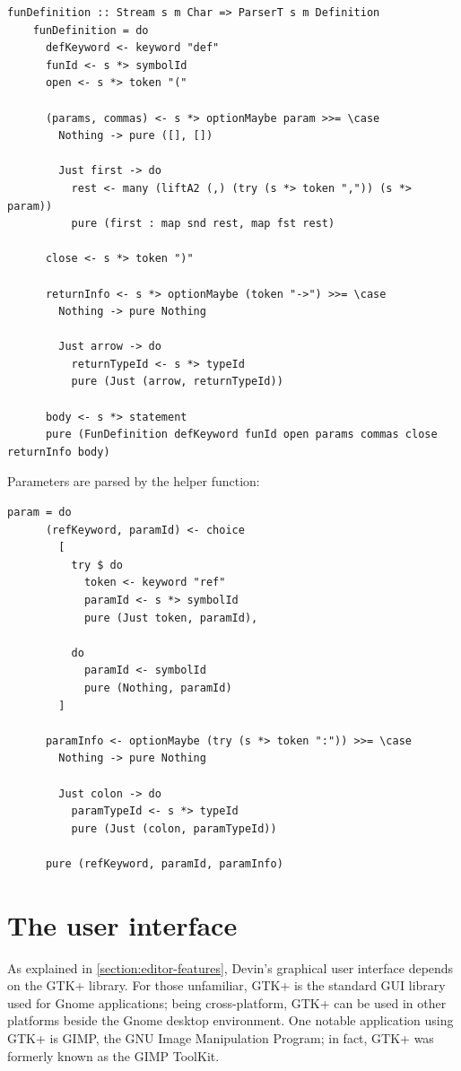 \documentclass[UdineBachThesis,american,11pt]{PhdThesis}
\begin{document}
  \begin{lstlisting}[gobble=4,basicstyle=\ttfamily\small]
    funDefinition :: Stream s m Char => ParserT s m Definition
    funDefinition = do
      defKeyword <- keyword "def"
      funId <- s *> symbolId
      open <- s *> token "("

      (params, commas) <- s *> optionMaybe param >>= \case
        Nothing -> pure ([], [])

        Just first -> do
          rest <- many (liftA2 (,) (try (s *> token ",")) (s *> param))
          pure (first : map snd rest, map fst rest)

      close <- s *> token ")"

      returnInfo <- s *> optionMaybe (token "->") >>= \case
        Nothing -> pure Nothing

        Just arrow -> do
          returnTypeId <- s *> typeId
          pure (Just (arrow, returnTypeId))

      body <- s *> statement
      pure (FunDefinition defKeyword funId open params commas close returnInfo body)
  \end{lstlisting}

  \newpage

  Parameters are parsed by the \lstinline@param@ helper function:

  \begin{lstlisting}[gobble=4,basicstyle=\ttfamily\small]
    param = do
      (refKeyword, paramId) <- choice
        [
          try $ do
            token <- keyword "ref"
            paramId <- s *> symbolId
            pure (Just token, paramId),

          do
            paramId <- symbolId
            pure (Nothing, paramId)
        ]

      paramInfo <- optionMaybe (try (s *> token ":")) >>= \case
        Nothing -> pure Nothing

        Just colon -> do
          paramTypeId <- s *> typeId
          pure (Just (colon, paramTypeId))

      pure (refKeyword, paramId, paramInfo)
  \end{lstlisting}

  \section{The user interface}

  As explained in \autoref{section:editor-features}, Devin's graphical user
  interface depends on the GTK+ library. For those unfamiliar, GTK+ is the
  standard GUI library used for Gnome applications; being cross-platform, GTK+
  can be used in other platforms beside the Gnome desktop environment. One
  notable application using GTK+ is GIMP, the GNU Image Manipulation Program; in
  fact, GTK+ was formerly known as the GIMP ToolKit.
\end{document}
